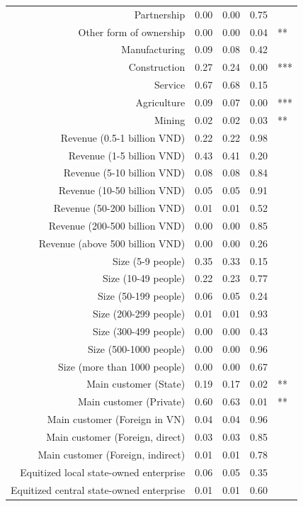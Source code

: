 \documentclass{beamer}
\begin{document}
\begin{frame}
\begin{columns}[T]
\begin{column}{.48\textwidth}
{{\begin{tabular}{rrrrl}
  Partnership & 0.00 & 0.00 & 0.75 &  \\ 
  Other form of ownership & 0.00 & 0.00 & 0.04 & ** \\ 
  Manufacturing & 0.09 & 0.08 & 0.42 &  \\ 
  Construction & 0.27 & 0.24 & 0.00 & *** \\ 
  Service & 0.67 & 0.68 & 0.15 &  \\ 
  Agriculture & 0.09 & 0.07 & 0.00 & *** \\ 
  Mining & 0.02 & 0.02 & 0.03 & ** \\ 
  Revenue (0.5-1 billion VND) & 0.22 & 0.22 & 0.98 &  \\ 
  Revenue (1-5 billion VND) & 0.43 & 0.41 & 0.20 &  \\ 
  Revenue (5-10 billion VND) & 0.08 & 0.08 & 0.84 &  \\ 
  Revenue (10-50 billion VND) & 0.05 & 0.05 & 0.91 &  \\ 
  Revenue (50-200 billion VND) & 0.01 & 0.01 & 0.52 &  \\ 
  Revenue (200-500 billion VND) & 0.00 & 0.00 & 0.85 &  \\ 
  Revenue (above 500 billion VND) & 0.00 & 0.00 & 0.26 &  \\ 
  Size (5-9 people) & 0.35 & 0.33 & 0.15 &  \\ 
  Size (10-49 people) & 0.22 & 0.23 & 0.77 &  \\ 
  Size (50-199 people) & 0.06 & 0.05 & 0.24 &  \\ 
  Size (200-299 people) & 0.01 & 0.01 & 0.93 &  \\ 
  Size (300-499 people) & 0.00 & 0.00 & 0.43 &  \\ 
  Size (500-1000 people) & 0.00 & 0.00 & 0.96 &  \\ 
  Size (more than 1000 people) & 0.00 & 0.00 & 0.67 &  \\ 
  Main customer (State) & 0.19 & 0.17 & 0.02 & ** \\ 
  Main customer (Private) & 0.60 & 0.63 & 0.01 & ** \\ 
  Main customer (Foreign in VN) & 0.04 & 0.04 & 0.96 &  \\ 
  Main customer (Foreign, direct) & 0.03 & 0.03 & 0.85 &  \\ 
  Main customer (Foreign, indirect) & 0.01 & 0.01 & 0.78 &  \\ 
  Equitized local state-owned enterprise & 0.06 & 0.05 & 0.35 &  \\ 
  Equitized central state-owned enterprise & 0.01 & 0.01 & 0.60 &  \\ 

\end{tabular}}}
\end{column}
\end{columns}
\end{frame}
\end{document}
